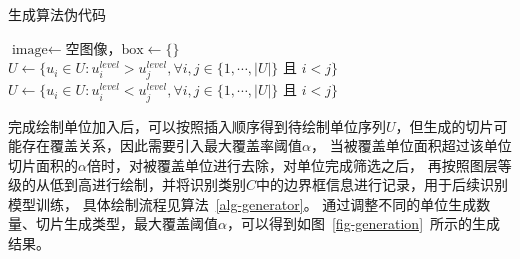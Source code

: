 \documentclass[openany,twoside,nofonts,AutoFakeBold,UTF8]{ctexbook}
\begin{document}
\begin{algorithm}[ht]
	\caption{生成算法伪代码\label{alg-generator}}
	\IncMargin{2em}
	\DontPrintSemicolon
  $\text{image}\gets$空图像，$\text{box}\gets \{\}$
  $U\gets \{u_i\in U: u_i^{level}>u_j^{level}, \forall i, j \in \{1,\cdots,|U|\} \text{~且~} i < j\}$\;
  $U\gets \{u_i\in U: u_i^{level}<u_j^{level}, \forall i, j \in \{1,\cdots,|U|\} \text{~且~} i < j\}$\;
\end{algorithm}
\newpage
完成绘制单位加入后，可以按照插入顺序得到待绘制单位序列$U$，但生成的切片可能存在覆盖关系，因此需要引入最大覆盖率阈值$\alpha$，
当被覆盖单位面积超过该单位切片面积的$\alpha$倍时，对被覆盖单位进行去除，对单位完成筛选之后，
再按照图层等级的从低到高进行绘制，并将识别类别$C$中的边界框信息进行记录，用于后续识别模型训练，
具体绘制流程见算法~\ref{alg-generator}。%
通过调整不同的单位生成数量、切片生成类型，最大覆盖阈值$\alpha$，可以得到如图~\ref{fig-generation}~所示的生成结果。
\end{document}

